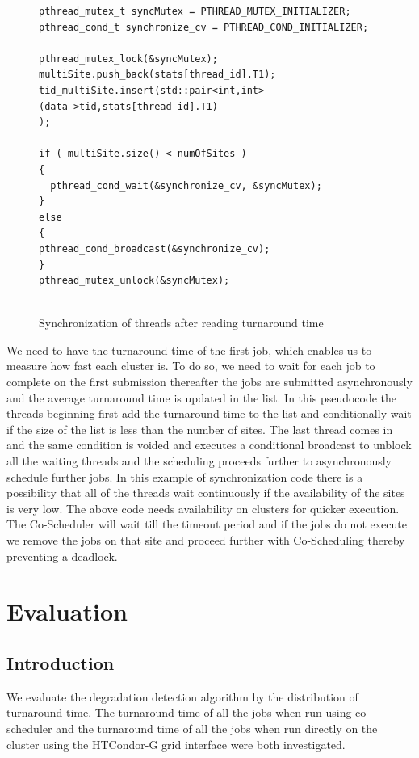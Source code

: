 \documentclass[ms,electronic,double]{nuthesis}
\begin{document}
\begin{figure}[htbp!]

\begin{lstlisting}
pthread_mutex_t syncMutex = PTHREAD_MUTEX_INITIALIZER;
pthread_cond_t synchronize_cv = PTHREAD_COND_INITIALIZER;

pthread_mutex_lock(&syncMutex);    
multiSite.push_back(stats[thread_id].T1);	
tid_multiSite.insert(std::pair<int,int>
(data->tid,stats[thread_id].T1)
);
	   
if ( multiSite.size() < numOfSites )
{
  pthread_cond_wait(&synchronize_cv, &syncMutex);
}
else
{		
pthread_cond_broadcast(&synchronize_cv);
}
pthread_mutex_unlock(&syncMutex);
    
\end{lstlisting}
\caption{Synchronization of threads after reading turnaround time}
\label{fig:synchronization}
\end{figure}
\FloatBarrier

We need to have the turnaround time of the first job,  which enables us to measure 
how fast each cluster is. To do so, we need to wait for each job to complete on 
the first submission thereafter the jobs are submitted asynchronously and the 
average turnaround time is updated in the list. In this pseudocode the threads 
beginning first add the turnaround time to the list and conditionally wait if 
the size of the list is less than the number of sites. The last thread comes in 
and the same condition is voided and executes a conditional broadcast to unblock 
all the waiting threads and the scheduling proceeds further to asynchronously schedule further 
jobs.
In this example of synchronization code there is a possibility that all of the 
threads wait continuously if the availability of the sites is very low. The 
above code needs availability on clusters for quicker execution. The 
Co-Scheduler will wait till the timeout period and if the jobs do not execute we 
remove the jobs on that site and proceed further with Co-Scheduling thereby preventing a deadlock.
\chapter{Evaluation}

\section{Introduction}
We evaluate the degradation detection algorithm by the distribution of turnaround time. The turnaround 
time of all the jobs when run using co-scheduler and the turnaround time of all 
the jobs when run directly on the cluster using the HTCondor-G grid interface were both investigated.
\end{document}
